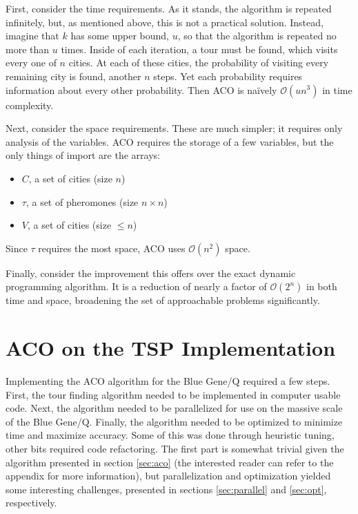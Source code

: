 \documentclass[twocolumn]{article}
\begin{document}
First, consider the time requirements. As it stands, the algorithm is repeated 
infinitely, but, as mentioned above, 
this is not a practical solution. Instead, imagine that $k$ has some upper 
bound, $u$, so that the algorithm is repeated no more than $u$ times. Inside of each iteration, 
a tour must be found, which visits every one of $n$ cities. At each of these cities, 
the probability of visiting every remaining city is found, another $n$ steps. Yet each 
probability requires information about every other probability. Then ACO is na\"{i}vely
$\mathcal{O}(un^3)$ in time complexity. 

Next, consider the space requirements. These are much simpler; it requires only analysis 
of the variables. ACO requires the storage of a few variables, but the only things of 
import are the arrays:
\begin{itemize}
\item $C$, a set of cities (size $n$)
\item $\tau$, a set of pheromones (size $n\times n$)
\item $V$, a set of cities (size $\leq n$)
\end{itemize}
Since $\tau$ requires the most space, ACO uses $\mathcal{O}(n^2)$ space. 

Finally, consider the improvement this offers over the exact dynamic programming 
algorithm. It is a reduction of nearly a factor of $\mathcal{O}(2^n)$ in both time
and space, broadening the set of approachable problems significantly. 

\section{ACO on the TSP Implementation} \label{sub:acoimpl}

Implementing the ACO algorithm for the Blue Gene/Q required a few steps. First,
the tour finding algorithm needed to be implemented in computer usable code. 
Next, the algorithm needed to be parallelized for use on the massive scale of
the Blue Gene/Q. Finally, the algorithm needed to be optimized to minimize 
time and maximize accuracy. Some of this was done through heuristic tuning,
other bits required code refactoring. The first part is somewhat trivial
given the algorithm presented in section \ref{sec:aco} (the interested reader 
can refer to the appendix for more information), but parallelization
and optimization yielded some interesting challenges, presented in sections
\ref{sec:parallel} and \ref{sec:opt}, respectively. 
\end{document}
